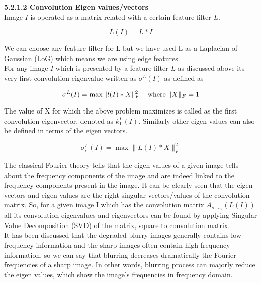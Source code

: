 \documentclass{article}
\begin{document}
\textbf{5.2.1.2 Convolution Eigen values/vectors} \\

Image $I$ is operated as a matrix related with a certain feature filter $L$.

\begin{equation}
    L(I) = L * I
\end{equation}

We can choose any feature filter for L but we have used L as a Laplacian of Gaussian (LoG) which means we are using edge features.  \\

For any image $I$ which is presented by a feature filter $L$ as discussed above its very first convolution eigenvalue written as $\sigma^{L}(I)$ as defined as

\begin{equation}
    \sigma^{L}(I) = \max \|l(I) * X\|_{F}^2 \hspace{.4cm} \text{where $\|X\|_F = 1$}
\end{equation}

The value of X for which the above problem maximizes is called as the first convolution eigenvector, denoted as $k_1^L(I)$. Similarly other eigen values can also be defined in terms of the eigen vectors. 

\begin{equation}
    \sigma_i^L(I) = \max \|L(I) * X\|^2_F
\end{equation}

The classical Fourier theory tells that the eigen values of a given image tells about the frequency components of the image and are indeed linked to the frequency components present in the image. It can be clearly seen that the eigen vectors and eigen values are the right singular vectors/values of the convolution matrix. So, for a given image I which has the convolution matrix $A_{s_1, s_2}(L(I))$ all its convolution eigenvalues and eigenvectors can be found by applying Singular Value Decomposition (SVD) of the matrix, square to convolution matrix. \\

It has been discussed that the degraded blurry images generally contains low frequency information and the sharp images often contain high frequency information, so we can say that blurring decreases dramatically the Fourier frequencies of a sharp image. In other words, blurring process can majorly reduce the eigen values, which show the image’s frequencies in frequency domain. \\
\end{document}

